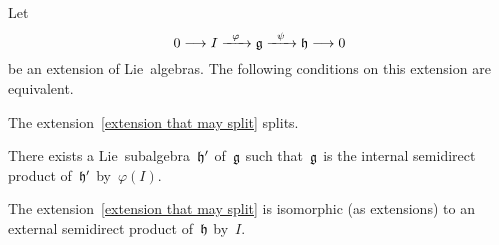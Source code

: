 \begin{proposition}
  Let
  \begin{equation}
    \label{extension that may split}
    0
    \to
    I
    \xto{\varphi}
    \glie
    \xto{\psi}
    \hlie
    \to
    0
  \end{equation}
  be an extension of Lie~algebras.
  The following conditions on this extension are equivalent.
  \begin{equivalenceslist}
    \item
      \label{the extension splits}
      The extension~\eqref{extension that may split} splits.
    \item
      \label{is an internal semidirect product}
      There exists a Lie~subalgebra~$\mathfrak{h}'$ of~$\mathfrak{g}$ such that~$\mathfrak{g}$ is the internal semidirect product of~$\mathfrak{h}'$ by~$\varphi(I)$.
    \item
      \label{is an external semidirect product}
      The extension~\eqref{extension that may split} is isomorphic (as extensions) to an external semidirect product of~$\mathfrak{h}$ by~$I$.
  \end{equivalenceslist}
\end{proposition}



